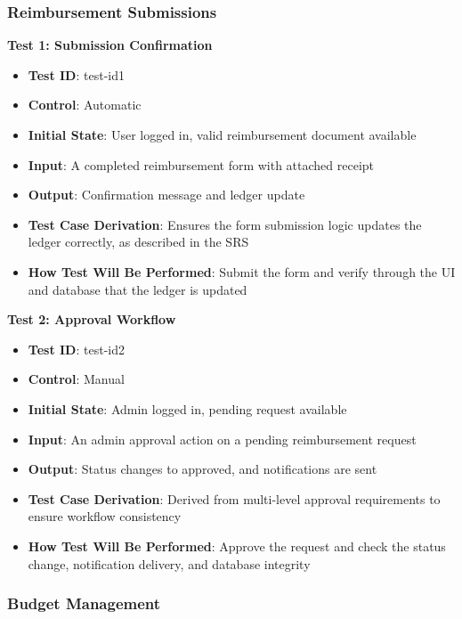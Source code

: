 \documentclass[12pt, titlepage]{article}
\begin{document}
\subsubsection{Reimbursement Submissions}

\textbf{Test 1: Submission Confirmation}
\begin{itemize}
    \item \textbf{Test ID}: test-id1
    \item \textbf{Control}: Automatic
    \item \textbf{Initial State}: User logged in, valid reimbursement document available
    \item \textbf{Input}: A completed reimbursement form with attached receipt
    \item \textbf{Output}: Confirmation message and ledger update
    \item \textbf{Test Case Derivation}: Ensures the form submission logic updates the ledger correctly, as described in the SRS
    \item \textbf{How Test Will Be Performed}: Submit the form and verify through the UI and database that the ledger is updated
\end{itemize}

\textbf{Test 2: Approval Workflow}
\begin{itemize}
    \item \textbf{Test ID}: test-id2
    \item \textbf{Control}: Manual
    \item \textbf{Initial State}: Admin logged in, pending request available
    \item \textbf{Input}: An admin approval action on a pending reimbursement request
    \item \textbf{Output}: Status changes to approved, and notifications are sent
    \item \textbf{Test Case Derivation}: Derived from multi-level approval requirements to ensure workflow consistency
    \item \textbf{How Test Will Be Performed}: Approve the request and check the status change, notification delivery, and database integrity
\end{itemize}

\subsubsection{Budget Management}
\end{document}
